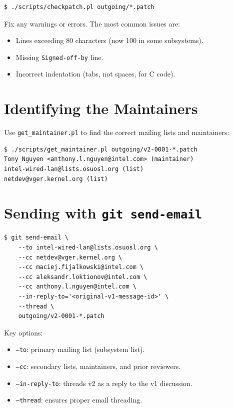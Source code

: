 \documentclass[11pt,a4paper,openany]{book}
\begin{document}
\begin{lstlisting}[style=shellstyle]
$ ./scripts/checkpatch.pl outgoing/*.patch
\end{lstlisting}

Fix any warnings or errors.  The most common issues are:
\begin{itemize}
\item Lines exceeding 80 characters (now 100 in some subsystems).
\item Missing \texttt{Signed-off-by} line.
\item Incorrect indentation (tabs, not spaces, for C code).
\end{itemize}

\section{Identifying the Maintainers}

Use \texttt{get\_maintainer.pl} to find the correct mailing lists and
maintainers:

\begin{lstlisting}[style=shellstyle]
$ ./scripts/get_maintainer.pl outgoing/v2-0001-*.patch
Tony Nguyen <anthony.l.nguyen@intel.com> (maintainer)
intel-wired-lan@lists.osuosl.org (list)
netdev@vger.kernel.org (list)
\end{lstlisting}

\section{Sending with \texttt{git send-email}}

\begin{lstlisting}[style=shellstyle]
$ git send-email \
    --to intel-wired-lan@lists.osuosl.org \
    --cc netdev@vger.kernel.org \
    --cc maciej.fijalkowski@intel.com \
    --cc aleksandr.loktionov@intel.com \
    --cc anthony.l.nguyen@intel.com \
    --in-reply-to='<original-v1-message-id>' \
    --thread \
    outgoing/v2-0001-*.patch
\end{lstlisting}

Key options:
\begin{itemize}
\item \texttt{--to}: primary mailing list (subsystem list).
\item \texttt{--cc}: secondary lists, maintainers, and prior reviewers.
\item \texttt{--in-reply-to}: threads v2 as a reply to the v1
    discussion.
\item \texttt{--thread}: ensures proper email threading.
\end{itemize}
\end{document}
